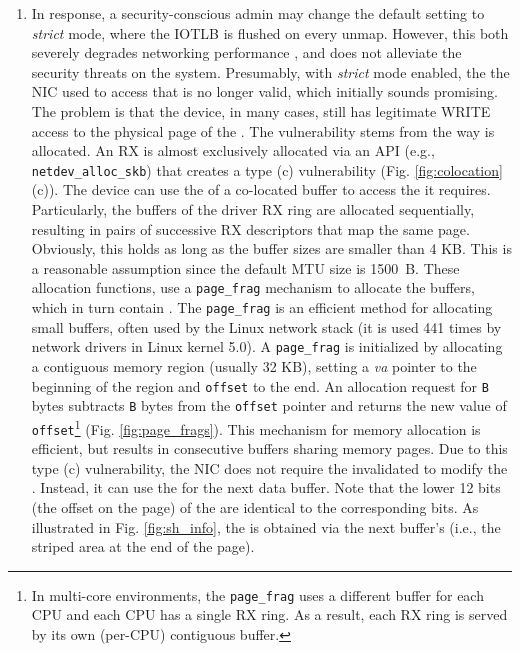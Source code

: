 \begin{enumerate}[label=(\roman*),wide, labelwidth=!, labelindent=0pt]
\item In response, a security-conscious admin may change the default setting to \emph{strict} mode, where the IOTLB is flushed on every unmap. However, this both severely degrades networking performance \cite{MMT16,MSMT18}, and does not alleviate the security threats on the system. Presumably, with \emph{strict} mode enabled, the \iova{} the NIC used to access that \shinfo{} is no longer valid, which initially sounds promising. The problem is that the device, in many cases, still has legitimate WRITE access to the physical page of the \shinfo. The vulnerability stems from the way \data{} is allocated. An RX \skb{} is almost exclusively allocated via an API (e.g., \texttt{netdev\_alloc\_skb}) that creates a type (c) \subpage{} vulnerability (Fig. \ref{fig:colocation}(c)). The device can use the \iova{} of a co-located buffer to access the \shinfo{} it requires. Particularly, the buffers of the driver RX ring are allocated sequentially, resulting in pairs of successive RX descriptors that map the same page. Obviously, this holds as long as the buffer sizes are smaller than 4 KB. This is a reasonable assumption since the default MTU size is 1500~B. These allocation functions, use a \texttt{page\_frag} mechanism to allocate the \data{} buffers, which in turn contain \shinfo. The \texttt{page\_frag} is an efficient method for allocating small buffers, often used by the Linux network stack (it is used 441 times by network drivers in Linux kernel 5.0). A \texttt{page\_frag} is initialized by allocating a contiguous memory region (usually 32 KB), setting a \textit{va} pointer to the beginning of the region and \texttt{offset} to the end. An allocation request for \texttt{B} bytes subtracts \texttt{B} bytes from the \texttt{offset} pointer and returns the new value of \texttt{offset}\footnote{In multi-core environments, the \texttt{page\_frag} uses a different buffer for each CPU and each CPU has a single RX ring. As a result, each RX ring is served by its own (per-CPU) contiguous buffer.} (Fig. \ref{fig:page_frags}). This mechanism for memory allocation is efficient, but results in consecutive \data{} buffers sharing memory pages. Due to this type (c) \subpage{} vulnerability, the NIC does not require the invalidated \iova{} to modify the \shinfo. Instead, it can use the \iova{} for the next data buffer. Note that the lower 12 bits (the offset on the page) of the \iova{} are identical to the corresponding \kva{} bits. As illustrated in Fig. \ref{fig:sh_info}, the \oportunity{} is obtained via the next buffer's \iova{} (i.e., the striped area at the end of the page).
\end{enumerate}

